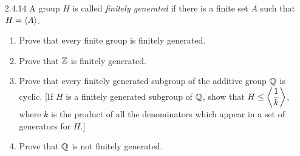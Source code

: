 \begin{enumerate}
      \textbf{Proof.} Let $\Q^+ = \left\{\D\frac{a}{b} : \text{$a$ and $b$ are
      positive integers}\right\}$ be the multiplicative group of positive
      rational numbers and $P = \left\{\D\frac{1}{p} : p
      \text{ is a prime}\right\}$. Clearly $\cyc{P} \subseteq \Q^+$, so it 
      suffices to show reverse containment. Consider $x/y \in \Q^+$. We shall
      now investigate the following cases:

      \textbf{Case 1.} $x = 1$ and $y > 1$. By the Fundamental Theorem of
      Arithmetic, there exist primes $p_1, p_2, \ldots, p_n$ such that
      $y = p_1p_2\cdots p_n$ (and so that $1/p^i \in \cyc{P}, 1 \le i \le n$). 
      Since $\cyc{P}$ is closed under multiplication, it follows that
      $$\frac{x}{y} = \frac{1}{y} = \frac{1}{p_1}\frac{1}{p_2}\cdots
        \frac{1}{p_n} \in \cyc{P}.$$

      \textbf{Case 2.} $x > 1$ and $y = 1$. By Case 1, we have that
      $y/x \in \cyc{P}$. By closure we have that $(y/x)^{-1} = x/y \in \cyc{P}$.

      \textbf{Case 3.} $x > 1$ and $y > 1$. By Case 1, we have that
      $1/y \in \cyc{P}$; by Case 2, we have that $x/1 \in \cyc{P}$; thus it
      follows by closure of $\cyc{P}$ that $(x/1)(1/y) = x/y \in \cyc{P}$.

      Thus we conclude that $\Q^+ \subseteq \cyc{P}$ so that $\Q^+ = \cyc{P}$.
      \qed
   \item[2.4.14]  A group $H$ is called \textit{finitely generated} if there is
                  a finite set $A$ such that $H = \langle A \rangle$.
                  \begin{enumerate}
                     \item Prove that every finite group is finitely generated.
                     \item Prove that $\mathbb{Z}$ is finitely generated.
                     \item Prove that every finitely generated subgroup of the
                           additive group $\mathbb{Q}$ is cyclic. [If $H$ is a finitely
                           generated subgroup of $\mathbb{Q}$, show that
                           $H \le \left\langle \displaystyle\frac{1}{k} \right\rangle$, where $k$ is the product
                           of all the denominators which appear in a set of
                           generators for $H$.]
                     \item Prove that $\mathbb{Q}$ is not finitely generated.
                  \end{enumerate}


\end{enumerate}
